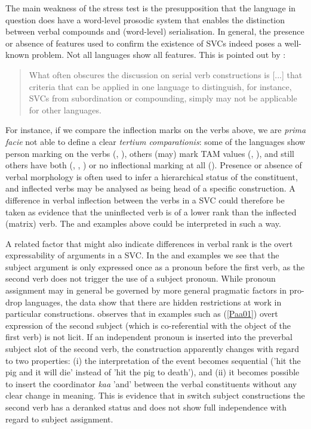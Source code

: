 The main weakness of the stress test is the presupposition that the language in question does have a word-level prosodic system that enables the distinction between verbal compounds and (word-level) serialisation. In general, the presence or absence of features used to confirm the existence of SVCs indeed poses a well-known problem. Not all languages show all features. This is pointed out by \citet[22]{vanstaden2008serial}: 

\begin{quote}What often obscures the discussion on serial verb constructions is [...] that criteria that can be applied in one language to distinguish, for instance, SVCs from subordination or compounding, simply may not be applicable for other languages.\end{quote}

For instance, if we compare the inflection marks on the verbs above, we are \textit{prima facie} not able to define a clear \textit{tertium comparationis}: some of the languages show person marking on the verbs (, ), others (may) mark TAM values (, ), and still others have both (, , ) or no inflectional marking at all (). Presence or absence of verbal morphology is often used to infer a hierarchical status of the constituent, and inflected verbs may be analysed as being head of a specific construction. A difference in verbal inflection between the verbs in a SVC could therefore be taken as evidence that the uninflected verb is of a lower rank than the inflected (matrix) verb. The  and  examples above could be interpreted in such a way. 

A related factor that might also indicate differences in verbal rank is the overt expressability of arguments in a SVC. In the  and  examples we see that the subject argument is only expressed once as a pronoun before the first verb, as the second verb does not trigger the use of a subject pronoun. While pronoun assignment may in general be governed by more general pragmatic factors in pro-drop languages, the  data show that there are hidden restrictions at work in particular constructions. \citet{crowley2002serial} observes that in examples such as (\ref{Paa01}) overt expression of the second subject (which is co-referential with the object of the first verb) is not licit. If an independent pronoun is inserted into the preverbal subject slot of the second verb, the construction apparently changes with regard to two properties: (i) the interpretation of the event becomes sequential ('hit the pig and it will die' instead of 'hit the pig to death'), and (ii) it becomes possible to insert the coordinator \textit{kaa} 'and' between the verbal constituents without any clear change in meaning. This is evidence that in  switch subject constructions the second verb has a deranked status and does not show full independence with regard to subject assignment.


